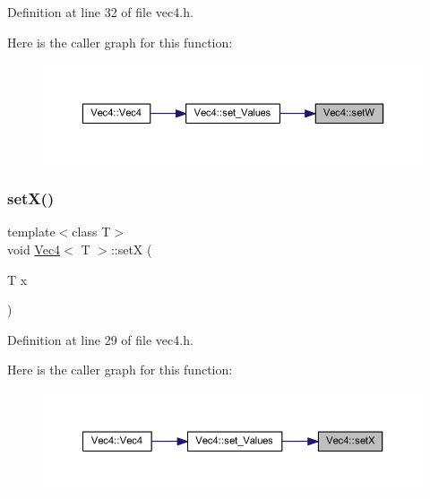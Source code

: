 Definition at line 32 of file vec4.\+h.

Here is the caller graph for this function\+:
\nopagebreak
\begin{figure}[H]
\begin{center}
\leavevmode
\includegraphics[width=350pt]{class_vec4_ad347e47a5371a8663d6b19c3bfaf4154_icgraph}
\end{center}
\end{figure}
\mbox{\label{class_vec4_a9f4e3566a9d832a0b1de1e6dbd9c6dbd}} 
\subsubsection{\texorpdfstring{setX()}{setX()}}
{\footnotesize\ttfamily template$<$class T$>$ \\
void \mbox{\hyperlink{class_vec4}{Vec4}}$<$ T $>$\+::setX (\begin{DoxyParamCaption}\item[{T}]{x }\end{DoxyParamCaption})\hspace{0.3cm}{\ttfamily [inline]}}



Definition at line 29 of file vec4.\+h.

Here is the caller graph for this function\+:
\nopagebreak
\begin{figure}[H]
\begin{center}
\leavevmode
\includegraphics[width=350pt]{class_vec4_a9f4e3566a9d832a0b1de1e6dbd9c6dbd_icgraph}
\end{center}
\end{figure}
\mbox{\label{class_vec4_a61084f24df2d63808656dc0a038a0ed7}} 
